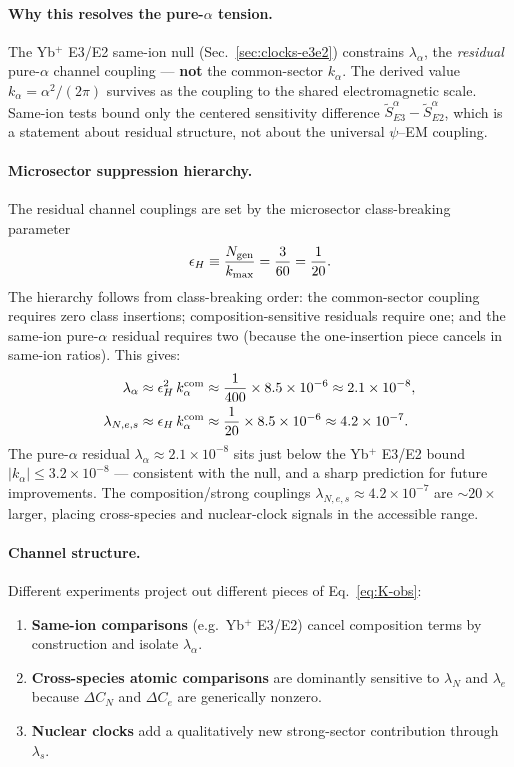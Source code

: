\paragraph{Why this resolves the pure-$\alpha$ tension.}
The Yb$^+$ E3/E2 same-ion null (Sec.~\ref{sec:clocks-e3e2}) constrains $\lambda_\alpha$, the \emph{residual} pure-$\alpha$ channel coupling --- \textbf{not} the common-sector $k_\alpha$.  The derived value $k_\alpha = \alpha^2/(2\pi)$ survives as the coupling to the shared electromagnetic scale.  Same-ion tests bound only the centered sensitivity difference $\widetilde{S}_{E3}^\alpha - \widetilde{S}_{E2}^\alpha$, which is a statement about residual structure, not about the universal $\psi$--EM coupling.

\paragraph{Microsector suppression hierarchy.}
The residual channel couplings are set by the microsector class-breaking parameter
\begin{equation}\label{eq:epsilon-H}
\epsilon_H \equiv \frac{N_{\rm gen}}{k_{\max}} = \frac{3}{60} = \frac{1}{20}.
\end{equation}
The hierarchy follows from class-breaking order: the common-sector coupling requires zero class insertions; composition-sensitive residuals require one; and the same-ion pure-$\alpha$ residual requires two (because the one-insertion piece cancels in same-ion ratios).  This gives:
\begin{align}
\lambda_\alpha &\approx \epsilon_H^2\,k_\alpha^{\rm com} \approx \frac{1}{400}\times 8.5\times10^{-6} \approx 2.1\times 10^{-8}, \label{eq:lambda-alpha}\\
\lambda_{N,e,s} &\approx \epsilon_H\,k_\alpha^{\rm com} \approx \frac{1}{20}\times 8.5\times10^{-6} \approx 4.2\times 10^{-7}. \label{eq:lambda-comp}
\end{align}
The pure-$\alpha$ residual $\lambda_\alpha \approx 2.1\times10^{-8}$ sits just below the Yb$^+$ E3/E2 bound $|k_\alpha| \le 3.2\times10^{-8}$ --- consistent with the null, and a sharp prediction for future improvements.  The composition/strong couplings $\lambda_{N,e,s} \approx 4.2\times10^{-7}$ are ${\sim}20\times$ larger, placing cross-species and nuclear-clock signals in the accessible range.

\paragraph{Channel structure.}
Different experiments project out different pieces of Eq.~\eqref{eq:K-obs}:
\begin{enumerate}
\item \textbf{Same-ion comparisons} (e.g.\ Yb$^+$ E3/E2) cancel composition terms by construction and isolate $\lambda_\alpha$.
\item \textbf{Cross-species atomic comparisons} are dominantly sensitive to $\lambda_N$ and $\lambda_e$ because $\Delta C_N$ and $\Delta C_e$ are generically nonzero.
\item \textbf{Nuclear clocks} add a qualitatively new strong-sector contribution through $\lambda_s$.
\end{enumerate}

